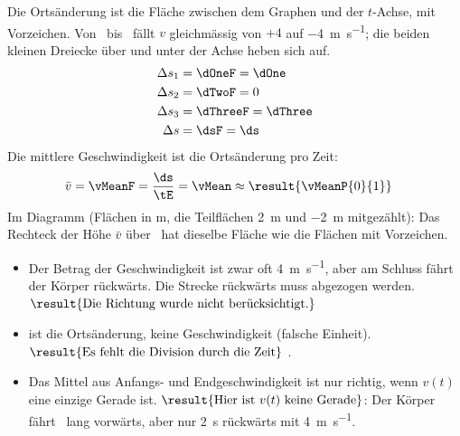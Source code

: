 \begin{abcliste}
\abc Die Ortsänderung ist die Fläche zwischen dem Graphen und der $t$-Achse, mit Vorzeichen. Von \tOneO\ bis \tTwoO\ fällt $v$ gleichmässig von $+4$ auf \SI{-4}{\meter\per\second}; die beiden kleinen Dreiecke über und unter der Achse heben sich auf.
\begin{align}
 \Delta s_1 &= \dOneF = \dOne \\
 \Delta s_2 &= \dTwoF = 0 \\
 \Delta s_3 &= \dThreeF = \dThree \\
 \Delta s &= \dsF = \ds
\end{align}
Die mittlere Geschwindigkeit ist die Ortsänderung pro Zeit:
\begin{align}
 \bar v &= \vMeanF = \frac{\ds}{\tE} = \vMean \approx \result{\vMeanP{0}{1}}
\end{align}
Im Diagramm (Flächen in \si{\meter}, die Teilflächen \SI{2}{\meter} und \SI{-2}{\meter} mitgezählt): Das Rechteck der Höhe $\bar v$ über \tEO\ hat dieselbe Fläche  wie die Flächen mit Vorzeichen.
\begin{center}
\end{center}
\abc
\begin{itemize}
\item[(i)] Der Betrag der Geschwindigkeit ist zwar oft \SI{4}{\meter\per\second}, aber am Schluss fährt der Körper rückwärts. Die Strecke rückwärts muss abgezogen werden. $\result{\text{Die Richtung wurde nicht berücksichtigt.}}$
\item[(ii)]  ist die Ortsänderung, keine Geschwindigkeit (falsche Einheit). $\result{\text{Es fehlt die Division durch die Zeit}}$ \tEO.
\item[(iii)] Das Mittel aus Anfangs- und Endgeschwindigkeit ist nur richtig, wenn $v(t)$ eine einzige Gerade ist. $\result{\text{Hier ist } v(t) \text{ keine Gerade}}$: Der Körper fährt \tOneO\ lang vorwärts, aber nur \SI{2}{\second} rückwärts mit \SI{4}{\meter\per\second}.
\end{itemize}
\end{abcliste}
